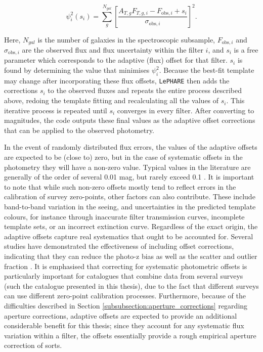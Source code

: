 \begin{equation}
\psi^2_{i}(s_{i}) = \sum_{g}^{N_{gal}}{{\left[ \frac{A_{T,g}F_{T,g,i} - F_{\mathrm{obs},i}+s_{i}}{\sigma_{\mathrm{obs},i}} \right] }^2}.\label{eqn:phi_squared}
\end{equation}

\noindent Here, $N_{gal}$ is the number of galaxies in the spectroscopic subsample, $F_{\mathrm{obs},i}$ and $\sigma_{\mathrm{obs},i}$ are the observed flux and flux uncertainty within the filter $i$, and $s_{i}$ is a free parameter which corresponds to the adaptive (flux) offset for that filter. $s_i$ is found by determining the value that minimises $\psi^2_i$. Because the best-fit template may change after incorporating these flux offsets, \texttt{LePHARE} then adds the corrections $s_{i}$ to the observed fluxes and repeats the entire process described above, redoing the template fitting and recalculating all the values of $s_{i}$. This iterative process is repeated until $s_{i}$ converges in every filter. After converting to magnitudes, the code outputs these final values as the adaptive offset corrections that can be applied to the observed photometry.\par


In the event of randomly distributed flux errors, the values of the adaptive offsets are expected to be (close to) zero, but in the case of systematic offsets in the photometry they will have a non-zero value. Typical values in the literature are generally of the order of several 0.01 mag, but rarely exceed 0.1 \citep{2006A&A...457..841I,2009ApJ...690.1236I,2013ApJ...775...93D}. It is important to note that while such non-zero offsets mostly tend to reflect errors in the calibration of survey zero-points, other factors can also contribute. These include band-to-band variation in the seeing, and uncertainties in the predicted template colours, for instance through inaccurate filter transmission curves, incomplete template sets, or an incorrect extinction curve. Regardless of the exact origin, the adaptive offsets capture real systematics that ought to be accounted for. Several studies have demonstrated the effectiveness of including offset corrections, indicating that they can reduce the photo-z bias \citep{2009ApJ...690.1236I} as well as the scatter and outlier fraction \citep{2013ApJ...775...93D}. It is emphasised that correcting for systematic photometric offsets is particularly important for catalogues that combine data from several surveys (such the \DESVIDEO catalogue presented in this thesis), due to the fact that different surveys can use different zero-point calibration processes. Furthermore, because of the difficulties described in Section \ref{subsubsection:aperture_corrections} regarding \DESVIDEO aperture corrections, adaptive offsets are expected to provide an additional considerable benefit for this thesis; since they account for any systematic flux variation within a filter, the offsets essentially provide a rough empirical aperture correction of sorts. \par



